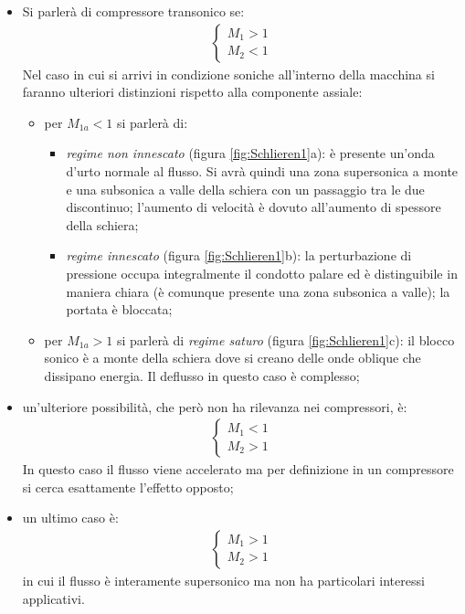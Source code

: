 \begin{itemize}
	\item Si parlerà di compressore transonico se:
	\begin{align*}
	\begin{cases}
	M_1 >1\\
	M_2 <1
	\end{cases}
	\end{align*} 
	Nel caso in cui si arrivi in condizione soniche all'interno della macchina si faranno ulteriori distinzioni rispetto alla componente assiale: 
	\begin{itemize}
		\item per $M_{1a} < 1 $ si parlerà di:
		\begin{itemize}
			\item \textit{regime non innescato} (figura \ref{fig:Schlieren1}a): è presente un'onda d'urto normale al flusso. Si avrà quindi una zona supersonica a monte e una subsonica a valle della schiera con un passaggio tra le due discontinuo; l'aumento di velocità è dovuto all'aumento di spessore della schiera;
			\item \textit{regime innescato} (figura \ref{fig:Schlieren1}b): la perturbazione di pressione occupa integralmente il condotto palare ed è distinguibile in maniera chiara (è comunque presente una zona subsonica a valle); la portata è bloccata; 
		\end{itemize}
		\item per $ M_{1a} > 1 $ si parlerà di \textit{regime saturo} (figura \ref{fig:Schlieren1}c): il blocco sonico è a monte della schiera dove si creano delle onde oblique che dissipano energia. Il deflusso in questo caso è complesso;
	\end{itemize}
	\item un'ulteriore possibilità, che però non ha rilevanza nei compressori, è:
	\begin{align*}
	\begin{cases}
	M_1 <1\\
	M_2 >1
	\end{cases}
	\end{align*} 
	In questo caso il flusso viene accelerato ma per definizione in un compressore si cerca esattamente l'effetto opposto;
	\item un ultimo caso è:
	\begin{align*}
	\begin{cases}
	M_1 >1\\
	M_2 >1
	\end{cases}
	\end{align*} 
	in cui il flusso è interamente supersonico ma non ha particolari interessi applicativi.
\end{itemize}
